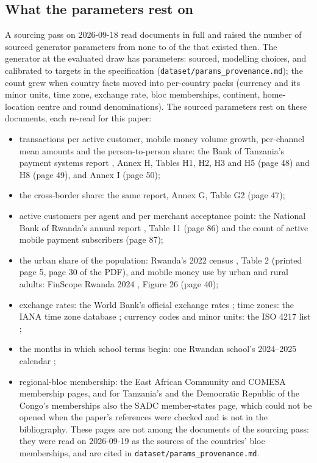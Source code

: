\subsection{What the parameters rest on}

A sourcing pass on 2026-09-18 read \nSourceDocs{} documents in full and raised the number of
sourced generator parameters from none to \nParamsSourced{} of the \nParamsTotal{} that existed
then. The generator at the evaluated draw has \nProvTotal{} parameters: \nProvSourced{} sourced,
\nProvAssumed{} modelling choices, and \nProvCalibrated{} calibrated to targets in the
specification (\texttt{dataset/params\_provenance.md}); the count grew when country facts moved into
per-country packs (currency and its minor units, time zone, exchange rate, bloc memberships,
continent, home-location centre and round denominations). The sourced parameters rest on these documents,
each re-read for this paper:
\begin{itemize}
  \item transactions per active customer, mobile money volume growth, per-channel mean amounts and
        the person-to-person share: the Bank of Tanzania's payment systems report
        \cite{botPSAR2024}, Annex H, Tables H1, H2, H3 and H5 (page 48) and H8 (page 49), and
        Annex I (page 50);
  \item the cross-border share: the same report, Annex G, Table G2 (page 47);
  \item active customers per agent and per merchant acceptance point: the National Bank of Rwanda's
        annual report \cite{bnrAR2425}, Table 11 (page 86) and the count of active mobile payment
        subscribers (page 87);
  \item the urban share of the population: Rwanda's 2022 census \cite{nisrCensus2022},
        Table 2 (printed page 5, page 30 of the PDF), and mobile money use by urban and rural adults:
        FinScope Rwanda 2024 \cite{afrFinscope2024}, Figure 26 (page 40);
  \item exchange rates: the World Bank's official exchange rates \cite{wbFCRF}; time zones: the
        IANA time zone database \cite{ianaTZ2026c}; currency codes and minor units: the ISO 4217
        list \cite{iso4217list};
  \item the months in which school terms begin: one Rwandan school's 2024--2025 calendar
        \cite{ngaCalendar2425};
  \item regional-bloc membership: the East African Community \cite{eacOverview} and COMESA
        \cite{comesaMembers} membership pages, and for Tanzania's and the Democratic Republic of the
        Congo's memberships also the SADC member-states page, which could not be opened when the
        paper's references were checked and is not in the bibliography. These pages are not among the \nSourceDocs{}
        documents of the sourcing pass: they were read on 2026-09-19 as the sources of the
        countries' bloc memberships, and are cited in \texttt{dataset/params\_provenance.md}.
\end{itemize}
